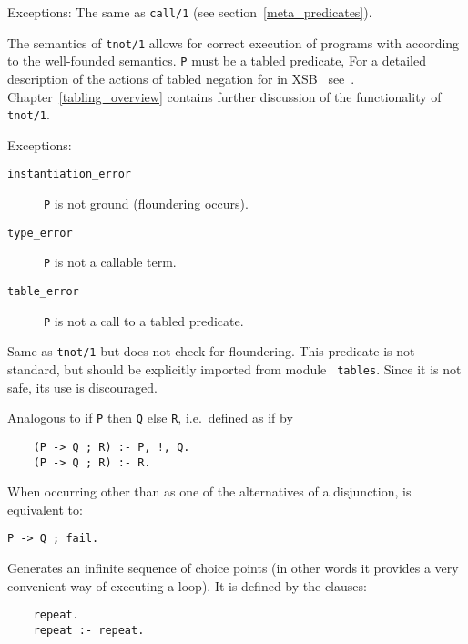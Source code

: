 \begin{description}
    Exceptions: The same as {\tt call/1} 
		(see section~\ref{meta_predicates}).

\label{tnot/1}
    The semantics of {\tt tnot/1} allows for correct execution of
    programs with according to the well-founded semantics.  {\tt P}
    must be a tabled predicate, 
%
% 
%
    For a detailed description of the actions of tabled negation for
    in XSB \version\ see~\cite{SaSw98, SaSW96}.
    Chapter~\ref{tabling_overview} contains further discussion of the
    functionality of {\tt tnot/1}.

    Exceptions:
    \begin{description}
    \item[{\tt instantiation\_error}]
	{\tt P} is not ground (floundering occurs).
    \item[{\tt type\_error}]
	{\tt P} is not a callable term.
    \item[{\tt table\_error}]
	{\tt P} is not a call to a tabled predicate.
    \end{description}

    Same as {\tt tnot/1} but does not check for floundering.  This predicate
    is not standard, but should be explicitly imported from module {\tt
    tables}.  Since it is not safe, its use is discouraged.

    Analogous to if {\tt P} then {\tt Q} else {\tt R}, i.e.\ defined as 
    if by
	\begin{center}
	\begin{minipage}{2.10in}
	\begin{verbatim}
	(P -> Q ; R) :- P, !, Q.
	(P -> Q ; R) :- R.
	\end{verbatim}
	\end{minipage}
	\end{center}

  
    When occurring other than as one of the alternatives of a disjunction,
    is equivalent to:
	\begin{center}
	{\tt P -> Q ; fail.}
	\end{center}

  
    Generates an infinite sequence of choice points (in other words it 
    provides a very convenient way of executing a loop). It is defined 
    by the clauses:
    \begin{center}
    \begin{minipage}{1.5in}
    \begin{verbatim}
	repeat.
	repeat :- repeat.
    \end{verbatim}
    \end{minipage}
    \end{center}

\end{description}



